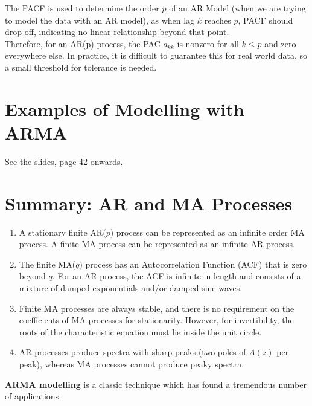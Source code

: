 The PACF is used to determine the order $p$ of an AR Model (when we are trying to model the data with an AR model), as when lag $k$ reaches $p$, PACF should drop off, indicating no linear relationship beyond that point.\\

Therefore, for an AR(p) process, the PAC $a_{kk}$ is nonzero for all $k \leq p$ and zero everywhere else. In practice, it is difficult to guarantee this for real world data, so a small threshold for tolerance is needed.

\section{Examples of Modelling with ARMA}
See the slides, page 42 onwards.


\section{Summary: AR and MA Processes}
\begin{enumerate}
    \item A stationary finite AR(\(p\)) process can be represented as an infinite order MA process. A finite MA process can be represented as an infinite AR process.
    \item The finite MA(\(q\)) process has an Autocorrelation Function (ACF) that is zero beyond \(q\). For an AR process, the ACF is infinite in length and consists of a mixture of damped exponentials and/or damped sine waves.
    \item Finite MA processes are always stable, and there is no requirement on the coefficients of MA processes for stationarity. However, for invertibility, the roots of the characteristic equation must lie inside the unit circle.
    \item AR processes produce spectra with sharp peaks (two poles of \(A(z)\) per peak), whereas MA processes cannot produce peaky spectra.
\end{enumerate}

\textbf{ARMA modelling} is a classic technique which has found a tremendous number of applications.

